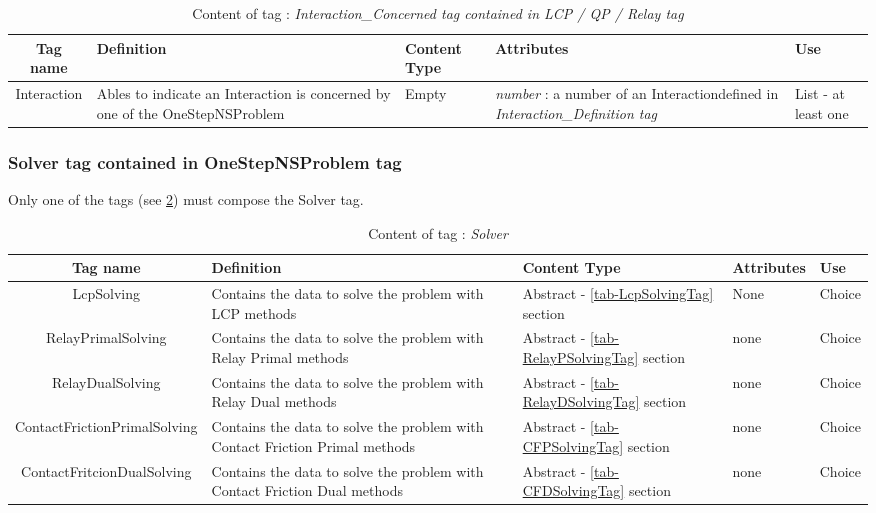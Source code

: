 \begin{table}[!hbp]
\begin{center}
\begin{tabular}{|c|p{4cm}|p{2cm}|p{5cm}|p{2cm}|}
\hline
\bf{Tag name} & \bf{Definition} & \bf{Content Type} & \bf{Attributes} & \bf{Use}
\\\hline
\hline
Interaction & Ables to indicate an Interaction is concerned by one of the OneStepNSProblem & Empty & \textit{number} : a number of an Interactiondefined in \textit{Interaction\_Definition tag} & List - at least one \\
\hline
\end{tabular}
\end{center}
\caption{Content of tag : \textit{Interaction\_Concerned tag contained in LCP / QP / Relay tag}}
\label{tab-OSNSPInteractionConcerned}
\end{table}



\subsubsection{Solver tag contained in OneStepNSProblem tag}
\label{OSNSPSolverTag}
Only one of the tags (see \ref{tab-SolverTag}) must compose the Solver tag.

\begin{table}[!hbp]
\begin{center}
\begin{tabular}{|c|p{4cm}|p{2cm}|p{2cm}|p{2cm}|}
\hline
\bf{Tag name} & \bf{Definition} & \bf{Content Type} & \bf{Attributes} & \bf{Use}
\\\hline
\hline
LcpSolving		  & Contains the data to solve the problem with LCP methods & Abstract - \ref{tab-LcpSolvingTag} section & None &  Choice \\
RelayPrimalSolving	& Contains the data to solve the problem with Relay Primal methods & Abstract - \ref{tab-RelayPSolvingTag} section & none &  Choice \\
RelayDualSolving	& Contains the data to solve the problem with Relay Dual methods & Abstract - \ref{tab-RelayDSolvingTag} section & none &  Choice \\
ContactFrictionPrimalSolving  & Contains the data to solve the problem with Contact Friction Primal methods & Abstract - \ref{tab-CFPSolvingTag} section & none &  Choice \\
ContactFritcionDualSolving	  & Contains the data to solve the problem with Contact Friction Dual methods & Abstract - \ref{tab-CFDSolvingTag} section & none &  Choice \\
\hline
\end{tabular}
\end{center}
\caption{Content of tag : \textit{Solver}}
\label{tab-SolverTag}
\end{table}

